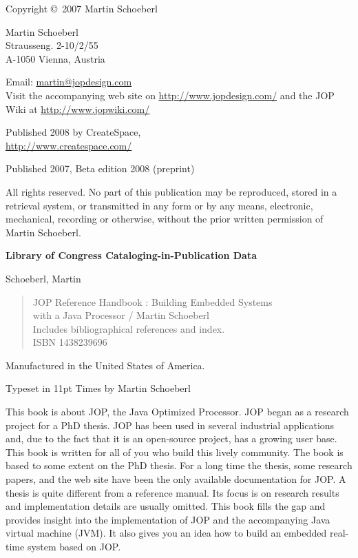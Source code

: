 \thispagestyle{empty}
\begin{flushleft}
{\small

Copyright \copyright \ 2007 Martin Schoeberl
\medskip

Martin Schoeberl\\
Strausseng. 2-10/2/55\\
A-1050 Vienna, Austria\\
\medskip

Email: \url{martin@jopdesign.com}\\
Visit the accompanying web site on \url{http://www.jopdesign.com/}
and the JOP Wiki at \url{http://www.jopwiki.com/}
\medskip

Published 2008 by CreateSpace,\\
\url{http://www.createspace.com/}



\medskip

Published 2007, Beta edition 2008 (preprint)
\medskip

All rights reserved. No part of this publication may be reproduced,
stored in a retrieval system, or transmitted in any form or by any
means, electronic, mechanical, recording or otherwise, without the
prior written permission of Martin Schoeberl.
\medskip


\textbf{Library of Congress Cataloging-in-Publication Data}
\medskip

Schoeberl, Martin
\begin{quote}
    JOP Reference Handbook : Building Embedded Systems\\
    with a Java Processor / Martin Schoeberl\\
    Includes bibliographical references and index.\\
    ISBN 1438239696
\end{quote}

\bigskip


Manufactured in the United States of America.

Typeset in 11pt Times by Martin Schoeberl }
\end{flushleft}



This book is about JOP, the Java Optimized Processor. JOP began as a
research project for a PhD thesis. JOP has been used in several
industrial applications and, due to the fact that it is an
open-source project, has a growing user base. This book is written
for all of you who build this lively community. The book is based to
some extent on the PhD thesis. For a long time the thesis, some
research papers, and the web site  have been the only available
documentation for JOP. A thesis is quite different from a reference
manual. Its focus is on research results and implementation details
are usually omitted. This book fills the gap and provides insight
into the implementation of JOP and the accompanying Java virtual
machine (JVM). It also gives you an idea how to build an embedded
real-time system based on JOP.
